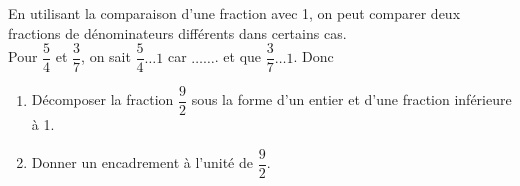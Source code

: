 \begin{Exemple}
En utilisant la comparaison d'une fraction avec 1, on peut comparer deux fractions de dénominateurs différents dans certains cas. \\
Pour $\dfrac{5}{4}$ et $\dfrac{3}{7}$, on sait $\dfrac{5}{4} \ldots 1$ car $\ldots \ldots$. et que $\dfrac{3}{7} \ldots 1$. Donc \ligne

\end{Exemple}


\begin{Exemple}
\begin{enumerate}
\item Décomposer la fraction $\dfrac{9}{2}$ sous la forme d'un entier et d'une fraction inférieure à 1. 

\ligne

\item Donner un encadrement à l'unité de $\dfrac{9}{2}$.

\ligne

\end{enumerate}
\end{Exemple}
